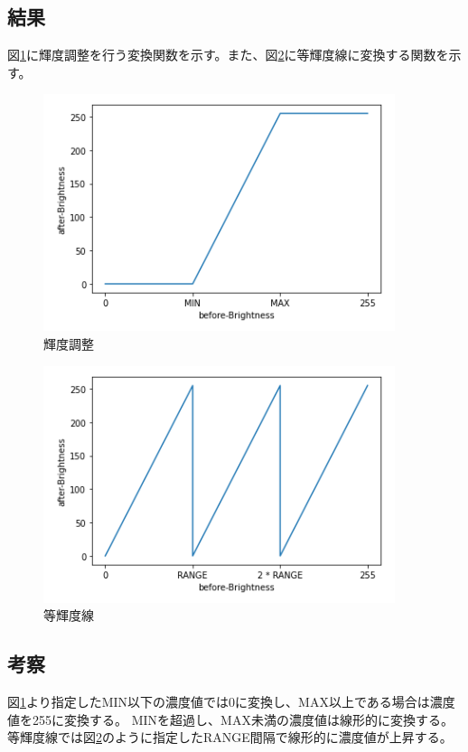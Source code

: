 \documentclass[11pt,a4paper,titlepage,dvipdfmx]{jarticle}
\begin{document}
    \subsection{結果}
      図\ref{fig:brightnessControl-graph}に輝度調整を行う変換関数を示す。また、図\ref{fig:isohighlightLine-graph}に等輝度線に変換する関数を示す。
      \begin{figure}[H]
        \centering
        \includegraphics[scale=.8]{./brightnessControl.png}
        \caption{輝度調整}
        \label{fig:brightnessControl-graph}
      \end{figure} 
      \begin{figure}[H]
        \centering
        \includegraphics[scale=.8]{./isohighlightLine.png}
        \caption{等輝度線}
        \label{fig:isohighlightLine-graph}
      \end{figure} 
    \subsection{考察}
      図\ref{fig:brightnessControl-graph}より指定したMIN以下の濃度値では0に変換し、MAX以上である場合は濃度値を255に変換する。
      MINを超過し、MAX未満の濃度値は線形的に変換する。
      等輝度線では図\ref{fig:isohighlightLine-graph}のように指定したRANGE間隔で線形的に濃度値が上昇する。
\end{document}
